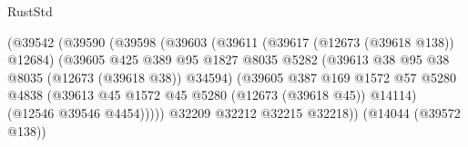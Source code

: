 \begin{lexlean}{RustStd}
\begin{coremodule}
{\begin{coremodule}
{{{{{{{{{{{{{{{{{{{{{{{{{{{{{{{{{{{{{{{{{{{{{{{{{{{{{{{{{{{{{{{{{{{{{{{{{{{{{{{{                                              (@39542
                                                (@39590
                                                  (@39598
                                                    (@39603
                                                      (@39611
                                                        (@39617 (@12673 (@39618 @138)) @12684)
                                                        (@39605
                                                          @425
                                                          @389
                                                          @95
                                                          @1827
                                                          @8035
                                                          @5282
                                                          (@39613
                                                            @38
                                                            @95
                                                            @38
                                                            @8035
                                                            (@12673 (@39618 @38))
                                                            @34594)
                                                          (@39605
                                                            @387
                                                            @169
                                                            @1572
                                                            @57
                                                            @5280
                                                            @4838
                                                            (@39613
                                                              @45
                                                              @1572
                                                              @45
                                                              @5280
                                                              (@12673 (@39618 @45))
                                                              @14114)
                                                            (@12546 @39546 @4454)))))
                                                    @32209
                                                    @32212
                                                    @32215
                                                    @32218))
                                                (@14044 (@39572 @138))
}}}}}}}}}}}}}}}}}}}}}}}}}}}}}}}}}}}}}}}}}}}}}}}}}}}}}}}}}}}}}}}}}}}}}}}}}}}}}}}}
\end{coremodule}}
\end{coremodule}
\end{lexlean}
